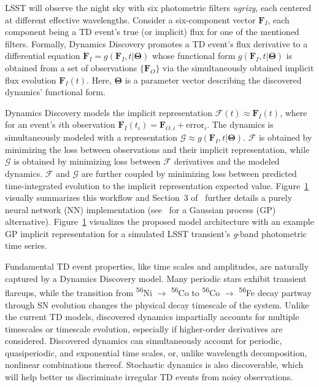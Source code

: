 \documentclass[modern]{aastex631}
\begin{document}
LSST will observe the night sky with six photometric filters \textit{ugrizy}, each centered at different effective wavelengths. 
Consider a six-component vector $\mathbf{F}_I$, each component being a TD event's true (or implicit) flux for one of the mentioned filters. 
Formally, Dynamics Discovery promotes a TD event's flux derivative to a differential equation $\dot{\mathbf{F}}_I = g(\mathbf{F}_I, t|\mathbf{\Theta})$ whose functional form $g(\mathbf{F}_I, t|\mathbf{\Theta})$ is obtained from a set of observations $\{\mathbf{F}_O\}$ via the simultaneously obtained implicit flux evolution $\mathbf{F}_I(t)$. 
Here, $\mathbf{\Theta}$ is a parameter vector describing the discovered dynamics' functional form. 
\begin{figure}
    \caption{}
    \label{fig:fig3}
\end{figure}

Dynamics Discovery models the implicit representation $\mathcal{F}(t)\approx\mathbf{F}_I(t)$, where for an event's $i$th observation $\mathbf{F}_I(t_i)=\mathbf{F}_{O,i}+\text{error}_i$. 
The dynamics is simultaneously modeled with a representation $\mathcal{G}\approx g(\mathbf{F}_I, t|\mathbf{\Theta})$. 
$\mathcal{F}$ is obtained by minimizing the loss between observations and their implicit representation, while $\mathcal{G}$ is obtained by minimizing loss between $\mathcal{F}$ derivatives and the modeled dynamics. 
$\mathcal{F}$ and $\mathcal{G}$ are further coupled by minimizing loss between predicted time-integrated evolution to the implicit representation expected value. 
Figure~\ref{fig:fig3} visually summarizes this workflow and Section~3 of~\cite{Goyal2022} further details a purely neural network (NN) implementation (see~\cite{Raissi2018} for a Gaussian process (GP) alternative). 
Figure~\ref{fig:fig3} visualizes the proposed model architecture with an example GP implicit representation for a simulated LSST transient's \textit{g}-band photometric time series. 

Fundamental TD event properties, like time scales and amplitudes, are naturally captured by a Dynamics Discovery model.
Many periodic stars exhibit transient flareups, while the transition from \textsuperscript{56}Ni $\rightarrow$ \textsuperscript{56}Co to \textsuperscript{56}Co $\rightarrow$ \textsuperscript{56}Fe decay partway through SN evolution changes the physical decay timescale of the system. 
Unlike the current TD models, discovered dynamics impartially accounts for multiple timescales or timescale evolution, especially if higher-order derivatives are considered. 
Discovered dynamics can simultaneously account for periodic, quasiperiodic, and exponential time scales, or, unlike wavelength decomposition, nonlinear combinations thereof. 
Stochastic dynamics is also discoverable, which will help better us discriminate irregular TD events from noisy observations. 
\end{document}
